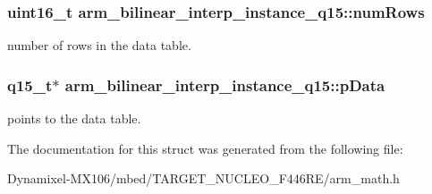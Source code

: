 \subsubsection[{\texorpdfstring{num\+Rows}{numRows}}]{\setlength{\rightskip}{0pt plus 5cm}uint16\+\_\+t arm\+\_\+bilinear\+\_\+interp\+\_\+instance\+\_\+q15\+::num\+Rows}\hypertarget{structarm__bilinear__interp__instance__q15_a2130ae30a804995a9f5d0e2189e08565}{}\label{structarm__bilinear__interp__instance__q15_a2130ae30a804995a9f5d0e2189e08565}
number of rows in the data table. 
\subsubsection[{\texorpdfstring{p\+Data}{pData}}]{\setlength{\rightskip}{0pt plus 5cm}q15\+\_\+t$\ast$ arm\+\_\+bilinear\+\_\+interp\+\_\+instance\+\_\+q15\+::p\+Data}\hypertarget{structarm__bilinear__interp__instance__q15_a50d75b1316cee3e0dfad6dcc4c9a2954}{}\label{structarm__bilinear__interp__instance__q15_a50d75b1316cee3e0dfad6dcc4c9a2954}
points to the data table. 

The documentation for this struct was generated from the following file\+:\begin{DoxyCompactItemize}
\item 
Dynamixel-\/\+M\+X106/mbed/\+T\+A\+R\+G\+E\+T\+\_\+\+N\+U\+C\+L\+E\+O\+\_\+\+F446\+R\+E/arm\+\_\+math.\+h\end{DoxyCompactItemize}

